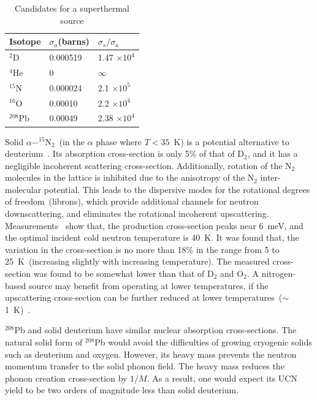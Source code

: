 \begin{table}
\begin{center}
\begin{tabular}{|l|l|l|}
\hline
Isotope & $\sigma_a$(barns) & $\sigma_s / \sigma_a$  \\
\hline
$^2$D & 0.000519 & 1.47 $\times 10^4$ \\
\hline
$^4$He & 0 & $\infty$ \\
\hline
$^{15}$N & 0.000024 & 2.1 $\times 10^5$ \\
\hline
$^{16}$O & 0.00010 & 2.2 $\times 10^4$ \\
\hline
$^{208}$Pb & 0.00049 &  2.38 $\times 10^4$\\
\hline
\end{tabular}
\end{center}
\caption{Candidates for a superthermal source\label{tab:other_sources}}
\end{table}

Solid $\alpha - ^{15}$N$_2$~(in the $\alpha$ phase where $T < 35$~K)
is a potential alternative to deuterium~\cite{Salvat2013}. Its
absorption cross-section is only 5\% of that of D$_2$, and it has a
negligible incoherent scattering cross-section. Additionally, rotation
of the N$_2$ molecules in the lattice is inhibited due to the
anisotropy of the N$_2$ inter-molecular potential. This leads to the
dispersive modes for the rotational degrees of freedom~(librons),
which provide additional channels for neutron downscattering, and
eliminates the rotational incoherent
upscattering. Measurements~\cite{Salvat2013} show that, the production
cross-section peaks near 6~meV, and the optimal incident cold neutron
temperature is 40~K. It was found that, the variation in the
cross-section is no more than 18\% in the range from 5 to
25~K~(increasing slightly with increasing temperature). The measured
cross-section was found to be somewhat lower than that of D$_2$ and
O$_2$.
A nitrogen-based source may benefit from operating at lower
temperatures, if the upscattering cross-section can be further reduced
at lower temperatures~($\sim$1~K)~\cite{Salvat2013}.


$^{208}$Pb and solid deuterium have similar nuclear absorption
cross-sections. The natural solid form of $^{208}$Pb would avoid the
difficulties of growing cryogenic solids such as deuterium and
oxygen. However, its heavy mass prevents the neutron momentum transfer
to the solid phonon field. The heavy mass reduces the phonon creation
cross-section by $1/M$. As a result, one would expect its UCN yield to
be two orders of magnitude less than solid deuterium.

